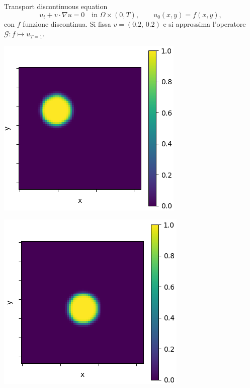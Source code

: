 \documentclass[aspectratio=169]{beamer}
\begin{document}
\begin{frame}[t]{Transport discontinuous equation}
    \[
    u_{t} + v \cdot \nabla u = 0 \quad \text{in } \Omega \times (0, T), \quad\quad u_{0}(x, y) = f(x, y),
    \]
    con $f$ funzione discontinua. Si fissa $v = (0.2, \, 0.2)$ e si approssima l'operatore $\mathcal{G}: f\mapsto u_{T=1}$.
    \begin{center}
        \begin{minipage}{0.24\textwidth}
            \includegraphics[width=\textwidth]{operators/discTrans/input.png}
        \end{minipage}
        \hfill
        \begin{minipage}{0.24\textwidth}
            \includegraphics[width=\textwidth]{operators/discTrans/output.png}

\end{minipage}
\end{center}
\end{frame}
\end{document}
